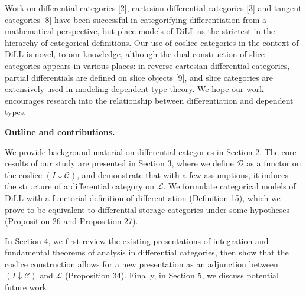 \documentclass[10pt,a4paper]{article}
\begin{document}
Work on differential categories [2], cartesian differential categories [3] and tangent categories [8] have been successful in categorifying differentiation from a mathematical perspective, but place models of $\mathrm{DiLL}$ as the strictest in the hierarchy of categorical definitions. Our use of coslice categories in the context of $\mathrm{DiLL}$ is novel, to our knowledge, although the dual construction of slice categories appears in various places: in reverse cartesian differential categories, partial differentials are defined on slice objects [9], and slice categories are extensively used in modeling dependent type theory. We hope our work encourages research into the relationship between differentiation and dependent types.\par
 
 
 
 
\par\medskip\noindent\textbf{Outline and contributions.}\par
 
 
We provide background material on differential categories in Section 2. The core results of our study are presented in Section 3, where we define $\mathcal{D}$ as a functor on the coslice $(I\downarrow\mathscr{C})$, and demonstrate that with a few assumptions, it induces the structure of a differential category on $\mathscr{L}$. We formulate categorical models of $\mathrm{DiLL}$ with a functorial definition of differentiation (Definition 15), which we prove to be equivalent to differential storage categories under some hypotheses (Proposition 26 and Proposition 27).\par
 
 
 
In Section 4, we first review the existing presentations of integration and fundamental theorems of analysis in differential categories, then show that the coslice construction allows for a new presentation as an adjunction between $(I\downarrow\mathscr{C})$ and $\mathscr{L}$ (Proposition 34). Finally, in Section 5, we discuss potential future work.\par
 
 
\end{document}
